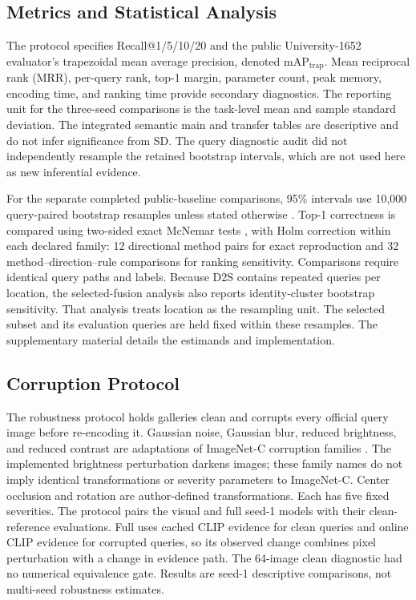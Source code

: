 \documentclass[journal]{IEEEtran}
\newcommand{\maptrap}{mAP$_{\mathrm{trap}}$}
\begin{document}
\subsection{Metrics and Statistical Analysis}

The protocol specifies Recall@1/5/10/20 and the public University-1652
evaluator's trapezoidal mean average precision, denoted \maptrap.
Mean reciprocal rank (MRR), per-query rank, top-1 margin, parameter count,
peak memory, encoding time, and ranking time provide secondary diagnostics.
The reporting unit for the three-seed comparisons is the task-level mean
and sample standard deviation. The integrated semantic main and transfer
tables are descriptive and do not infer significance from SD. The query
diagnostic audit did not independently resample the retained bootstrap
intervals, which are not used here as new inferential evidence.

For the separate completed public-baseline comparisons, 95\% intervals use 10,000
query-paired bootstrap resamples unless stated otherwise \cite{efron1979}.
Top-1 correctness is compared using two-sided exact McNemar tests
\cite{mcnemar1947,fay2010exact}, with Holm correction \cite{holm1979} within each declared
family: 12 directional method pairs for exact reproduction and 32
method--direction--rule comparisons for ranking sensitivity. Comparisons
require identical query paths and labels. Because D2S contains repeated
queries per location, the selected-fusion analysis also reports
identity-cluster bootstrap sensitivity. That analysis treats location as the resampling unit. The selected subset
and its evaluation queries are held fixed within these resamples. The
supplementary material details the estimands and implementation.

\subsection{Corruption Protocol}

The robustness protocol holds galleries clean and corrupts every official
query image before re-encoding it. Gaussian noise, Gaussian blur, reduced
brightness, and reduced contrast are adaptations of ImageNet-C corruption
families \cite{commoncorruptions2019}. The implemented brightness perturbation
darkens images; these family names do not imply identical transformations or
severity parameters to ImageNet-C. Center occlusion and rotation are
author-defined transformations. Each has five fixed severities. The protocol pairs the visual and full seed-1 models with their
clean-reference evaluations. Full uses cached CLIP evidence for clean
queries and online CLIP evidence for corrupted queries, so its observed
change combines pixel perturbation with a change in evidence path. The
64-image clean diagnostic had no numerical equivalence gate. Results are
seed-1 descriptive comparisons, not multi-seed robustness estimates.
\end{document}
